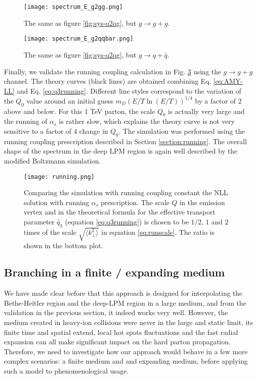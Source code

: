 \begin{figure}
\centering
\texttt{[image: spectrum\_E\_g2gg.png]}
\caption{The same as figure \ref{fig:sys-q2qg}, but $g \rightarrow g + g$.}
\label{fig:sys-g2gg}
\end{figure}

\begin{figure}
\centering
\texttt{[image: spectrum\_E\_g2qqbar.png]}
\caption{The same as figure \ref{fig:sys-q2qg}, but $g \rightarrow q + \bar{q}$.}
\label{fig:sys-g2qqbar}
\end{figure}

Finally, we validate the running coupling calculation in Fig. \ref{fig:running} using the $g\rightarrow g+g$ channel.
The theory curves (black lines) are obtained combining Eq. \ref{eq:AMY-LL} and Eq. \ref{eq:q3running}.
Different line styles correspond to the variation of the $Q_0$ value around an initial guess $m_D (E/T \ln(E/T) )^{1/4}$ by a factor of $2$ above and below.
For this 1 TeV parton, the scale $Q_0$ is actually very large and the running of $\alpha_s$ is rather slow, which explains the theory curve is not very sensitive to a factor of $4$ change in $Q_0$.
The simulation was performed using the running coupling prescription described in Section \ref{section:running}.
The overall shape of the spectrum in the deep LPM region is again well described by the modified Boltzmann simulation. 

\begin{figure}
\centering
\texttt{[image: running.png]}
\caption{Comparing the simulation with running coupling constant the NLL solution with running $\alpha_s$ prescription.
The scale $Q$ in the emission vertex and in the theoretical formula for the effective transport parameter $\hat{q}_3$ (equation \ref{eq:q3running}) is chosen to be $1/2$, $1$ and $2$ times of the scale $\sqrt{\langle k_\perp^2\rangle}$ in equation \ref{eq:runscale}.
The ratio is shown in the bottom plot.}
\label{fig:running}
\end{figure}

\subsection{Branching in a finite / expanding medium}
We have made clear before that this approach is designed for interpolating the Bethe-Heitler region and the deep-LPM region in a large medium, and from the validation in the previous section, it indeed works very well.
However, the medium created in heavy-ion collisions were never in the large and static limit, its finite time and spatial extend, local hot spots fluctuations and the fast radial expansion can all make significant impact on the hard parton propagation. 
Therefore, we need to investigate how our approach would behave in a few more complex scenarios: a finite medium and and expanding medium, before applying such a model to phenomenological usage.

